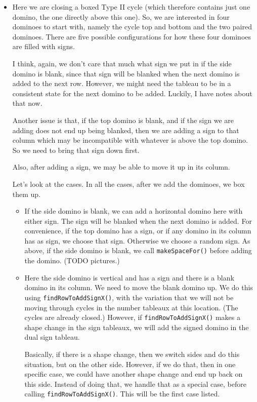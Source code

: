 \documentclass[12pt]{article}
\numberwithin{equation}{section}
\begin{document}
\begin{itemize}
\begin{itemize}
      \item Here we are closing a boxed Type II cycle (which therefore contains just one domino, the one directly above this one).
      So, we are interested in four dominoes to start with, namely the cycle top and bottom and the two paired dominoes.
      There are five possible configurations for how these four dominoes are filled with signs.

      I think, again, we don't care that much what sign we put in if the side domino is blank, since that sign will be blanked when the next domino is added to the next row.
      However, we might need the tableau to be in a consistent state for the next domino to be added.
      Luckily, I have notes about that now.

      Another issue is that, if the top domino is blank, and if the sign we are adding does not end up being blanked, then we are adding a sign to that column which may be incompatible with whatever is above the top domino.
      So we need to bring that sign down first.

      Also, after adding a sign, we may be able to move it up in its column.

      Let's look at the cases.
      In all the cases, after we add the dominoes, we box them up.
      \begin{itemize}
        \item If the side domino is blank, we can add a horizontal domino here with either sign.
        The sign will be blanked when the next domino is added.
        For convenience, if the top domino has a sign, or if any domino in its column has as sign, we choose that sign.
        Otherwise we choose a random sign.
        As above, if the side domino is blank, we call
        \texttt{makeSpaceFor()} before adding the domino.
        (TODO pictures.)

        \item Here the side domino is vertical and has a sign and there is a blank domino in its column.
        We need to move the blank domino up.
        We do this using \texttt{findRowToAddSignX()}, with the variation that we will not be moving through cycles in the number tableaux at this location.
        (The cycles are already closed.)
        However, if \texttt{findRowToAddSignX()} makes a shape change in the sign tableaux, we will add the signed domino in the dual sign tableau.

        Basically, if there is a shape change, then we switch sides and do this situation, but on the other side.
        However, if we do that, then in one specific case, we could have another shape change and end up back on this side.
        Instead of doing that, we handle that as a special case,
        before calling \texttt{findRowToAddSignX()}.
        This will be the first case listed.


\end{itemize}
\end{itemize}
\end{itemize}
\end{document}
